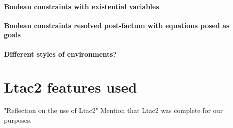 \paragraph{Boolean constraints with existential variables}

\paragraph{Boolean constraints resolved post-factum with equations posed as goals}

\paragraph{Different styles of environments?}

\section{Ltac2 features used}

"Reflection on the use of Ltac2"
Mention that Ltac2 was complete for our purposes.

